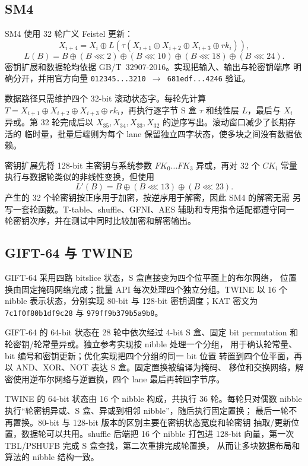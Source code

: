 \documentclass[11pt,a4paper,UTF8,fontset=none]{ctexart}
\begin{document}
\subsection{SM4}

SM4 使用 32 轮广义 Feistel 更新：
\[
  X_{i+4}=X_i\oplus L\!\left(\tau(X_{i+1}\oplus X_{i+2}
  \oplus X_{i+3}\oplus rk_i)\right),
\]
\[
  L(B)=B\oplus(B\lll2)\oplus(B\lll10)\oplus(B\lll18)\oplus(B\lll24).
\]
密钥扩展和数据轮均依据 GB/T~32907-2016。实现把输入、输出与轮密钥端序
明确分开，并用官方向量
\texttt{012345...3210 $\rightarrow$ 681edf...4246} 验证。

数据路径只需维护四个 32-bit 滚动状态字。每轮先计算
\(T=X_{i+1}\oplus X_{i+2}\oplus X_{i+3}\oplus rk_i\)，再执行逐字节
S 盒 \(\tau\) 和线性层 \(L\)，最后与 \(X_i\) 异或。第 32 轮完成后以
\(X_{35},X_{34},X_{33},X_{32}\) 的逆序写出。滚动窗口减少了长期存活的
临时量，批量后端则为每个 lane 保留独立四字状态，使多块之间没有数据依赖。

密钥扩展先将 128-bit 主密钥与系统参数 \(FK_0\ldots FK_3\) 异或，再对
32 个 \(CK_i\) 常量执行与数据轮类似的非线性变换，但使用
\[
 L'(B)=B\oplus(B\lll13)\oplus(B\lll23).
\]
产生的 32 个轮密钥按正序用于加密，按逆序用于解密，因此 SM4 的解密无需
另写一套轮函数。T-table、shuffle、GFNI、AES 辅助和专用指令适配都遵守同一
轮密钥次序，并在测试中同时比较加密和解密输出。

\subsection{GIFT-64 与 TWINE}

GIFT-64 采用四路 bitslice 状态，S 盒直接变为四个位平面上的布尔网络，
位置换由固定掩码网络完成；批量 API 每次处理四个独立分组。TWINE 以
16 个 nibble 表示状态，分别实现 80-bit 与 128-bit
密钥调度；KAT 密文为 \texttt{7c1f0f80b1df9c28} 与
\texttt{979ff9b379b5a9b8}。

GIFT-64 的 64-bit 状态在 28 轮中依次经过 4-bit S 盒、固定 bit
permutation 和轮密钥/轮常量异或。独立参考实现按 nibble 处理一个分组，
用于确认轮常量、bit 编号和密钥更新；优化实现把四个分组的同一 bit 位置
转置到四个位平面，再以 AND、XOR、NOT 表达 S 盒。固定置换被编译为掩码、
移位和交换网络，解密使用逆布尔网络与逆置换，四个 lane 最后再转回字节序。

TWINE 的 64-bit 状态由 16 个 nibble 构成，共执行 36 轮。每轮只对偶数
nibble 执行“轮密钥异或、S 盒、异或到相邻 nibble”，随后执行固定置换；
最后一轮不再置换。80-bit 与 128-bit 版本的区别主要在密钥状态宽度和轮密钥
抽取/更新位置，数据轮可以共用。shuffle 后端把 16 个 nibble 打包进
128-bit 向量，第一次 TBL/PSHUFB 完成 S 盒查找，第二次重排完成轮置换，
从而让多块数据布局和算法的 nibble 结构一致。
\end{document}
